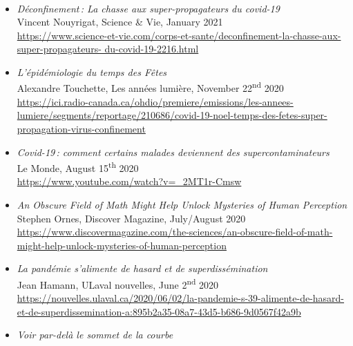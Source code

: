 \documentclass[11pt]{article}
\newcommand{\TitreSection}[1]{\colorbox{background}{\makebox[\textwidth-0.5em][c]{\Large\textrm{\textsc{#1}}}}\vspace{0.75\baselineskip}\\}
\begin{document}
%
%
%
%
%
\TitreSection{Selected Media Coverage}
%
\vspace{-0.75\baselineskip}
\begin{itemize}[itemsep=0.5em, first*=\small]
%
  \item \parbox[t]{0.9\textwidth}{\textit{Déconfinement\,: La chasse aux super-propagateurs du covid-19}\\
  {\small Vincent Nouyrigat, Science \& Vie, January 2021}\\
  \footnotesize\url{https://www.science-et-vie.com/corps-et-sante/deconfinement-la-chasse-aux-super-propagateurs- du-covid-19-2216.html}}
%
  \item \parbox[t]{0.9\textwidth}{\textit{L'épidémiologie du temps des Fêtes}\\
  {\small Alexandre Touchette, Les années lumière, November 22\textsuperscript{nd} 2020}\\
  \footnotesize\url{https://ici.radio-canada.ca/ohdio/premiere/emissions/les-annees-lumiere/segments/reportage/210686/covid-19-noel-temps-des-fetes-super-propagation-virus-confinement}}
%
  \item \parbox[t]{0.9\textwidth}{\textit{Covid-19\,: comment certains malades deviennent des supercontaminateurs}\\
  {\small Le Monde, August 15\textsuperscript{th} 2020}\\
  \footnotesize\url{https://www.youtube.com/watch?v=_2MT1r-Cmsw}}
%
  \item \parbox[t]{0.9\textwidth}{\textit{An Obscure Field of Math Might Help Unlock Mysteries of Human Perception}\\
  {\small Stephen Ornes, Discover Magazine, July/August 2020}\\
  \footnotesize\url{https://www.discovermagazine.com/the-sciences/an-obscure-field-of-math-might-help-unlock-mysteries-of-human-perception}}
%
  \item \parbox[t]{0.9\textwidth}{\textit{La pandémie s'alimente de hasard et de superdissémination}\\
  {\small Jean Hamann, ULaval nouvelles, June 2\textsuperscript{nd} 2020}\\
  \footnotesize\url{https://nouvelles.ulaval.ca/2020/06/02/la-pandemie-s-39-alimente-de-hasard-et-de-superdissemination-a:895b2a35-08a7-43d5-b686-9d0567f42a9b}}
%
  \item \parbox[t]{0.9\textwidth}{\textit{Voir par-delà le sommet de la courbe}\\
}
\end{itemize}
\end{document}
